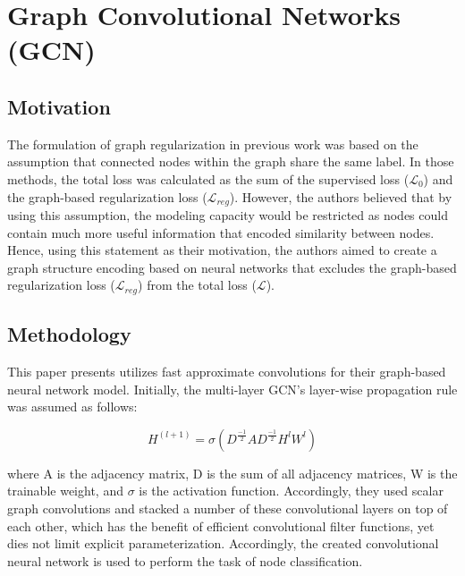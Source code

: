 \documentclass[12pt,a4paper]{article}
\begin{document}
	\newpage
	\section{Graph Convolutional Networks (GCN)}
	
	\subsection{Motivation}
	The formulation of graph regularization in previous work was based on the assumption that connected nodes within the graph share the same label. In those methods, the total loss was calculated as the sum of the supervised loss ($\mathcal{L}_{0}$) and the graph-based regularization loss ($\mathcal{L}_{reg}$). However, the authors believed that by using this assumption, the modeling capacity would be restricted as nodes could contain much more useful information that encoded similarity between nodes. Hence, using this statement as their motivation, the authors aimed to create a graph structure encoding based on neural networks that excludes the graph-based regularization loss ($\mathcal{L}_{reg}$) from the total loss ($\mathcal{L}$). 

	\vspace{-0.3cm}
	\subsection{Methodology}
	\noindent This paper presents utilizes fast approximate convolutions for their graph-based neural network model. Initially, the multi-layer GCN's layer-wise propagation rule was assumed as follows:
	
	\vspace{-0.4cm}
	\begin{equation}
		H^{(l+1)} = \sigma (D^{\frac{-1}{2}}AD^{\frac{-1}{2}}H^lW^l)
	\end{equation}
	\vspace{-0.5cm}

	\noindent where A is the adjacency matrix, D is the sum of all adjacency matrices, W is the trainable weight, and $\sigma$ is the activation function. Accordingly, they used scalar graph convolutions and stacked a number of these convolutional layers on top of each other, which has the benefit of efficient convolutional filter functions, yet dies not limit explicit  parameterization. Accordingly, the created convolutional neural network is used to perform the task of node classification.
	
	\vspace{-0.3cm}
\end{document}
